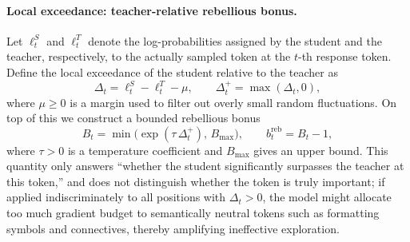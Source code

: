 \documentclass{article}
\begin{document}
\paragraph{Local exceedance: teacher-relative rebellious bonus.}
Let $\ell_t^S$ and $\ell_t^T$ denote the log-probabilities assigned by the student and the teacher, respectively, to the actually sampled token at the $t$-th response token. Define the local exceedance of the student relative to the teacher as
\begin{equation}
\Delta_t=\ell_t^S-\ell_t^T-\mu,
\qquad
\Delta_t^{+}=\max(\Delta_t,0),
\end{equation}
where $\mu\ge 0$ is a margin used to filter out overly small random fluctuations. On top of this we construct a bounded rebellious bonus
\begin{equation}
B_t=\min\!\big(\exp(\tau\,\Delta_t^{+}),\, B_{\max}\big),
\qquad
b_t^{\mathrm{reb}}=B_t-1,
\end{equation}
where $\tau>0$ is a temperature coefficient and $B_{\max}$ gives an upper bound. This quantity only answers ``whether the student significantly surpasses the teacher at this token,'' and does not distinguish whether the token is truly important; if applied indiscriminately to all positions with $\Delta_t>0$, the model might allocate too much gradient budget to semantically neutral tokens such as formatting symbols and connectives, thereby amplifying ineffective exploration.
\end{document}
